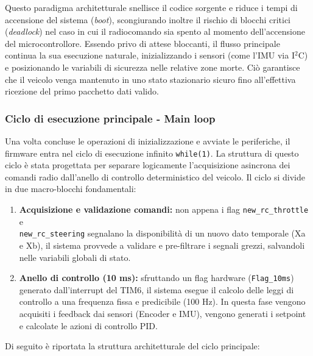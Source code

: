 \documentclass[11pt]{report}
\begin{document}
Questo paradigma architetturale snellisce il codice sorgente e riduce i tempi di accensione del sistema (\textit{boot}), scongiurando inoltre il rischio di blocchi critici (\textit{deadlock}) nel caso in cui il radiocomando sia spento al momento dell'accensione del microcontrollore. Essendo privo di attese bloccanti, il flusso principale continua la sua esecuzione naturale, inizializzando i sensori (come l'IMU via I$^2$C) e posizionando le variabili di sicurezza nelle relative zone morte.
Ciò garantisce che il veicolo venga mantenuto in uno stato stazionario sicuro fino all'effettiva ricezione del primo pacchetto dati valido.

\subsubsection{Ciclo di esecuzione principale - Main loop}
Una volta concluse le operazioni di inizializzazione e avviate le periferiche, il firmware entra nel ciclo di esecuzione infinito \verb|while(1)|. La struttura di questo ciclo è stata progettata per separare logicamente l'acquisizione asincrona dei comandi radio dall'anello di controllo deterministico del veicolo.
Il ciclo si divide in due macro-blocchi fondamentali:
\begin{enumerate}
    \item \textbf{Acquisizione e validazione comandi:} non appena i flag \verb|new_rc_throttle| e \\ \verb|new_rc_steering| segnalano la disponibilità di un nuovo dato temporale (Xa e Xb), il sistema provvede a validare e pre-filtrare i segnali grezzi, salvandoli nelle variabili globali di stato.
    \item \textbf{Anello di controllo (10 ms):} sfruttando un flag hardware (\verb|Flag_10ms|) generato dall'interrupt del TIM6, il sistema esegue il calcolo delle leggi di controllo a una frequenza fissa e predicibile (100 Hz). In questa fase vengono acquisiti i feedback dai sensori (Encoder e IMU), vengono generati i setpoint e calcolate le azioni di controllo PID.
\end{enumerate}
Di seguito è riportata la struttura architetturale del ciclo principale:
\end{document}
